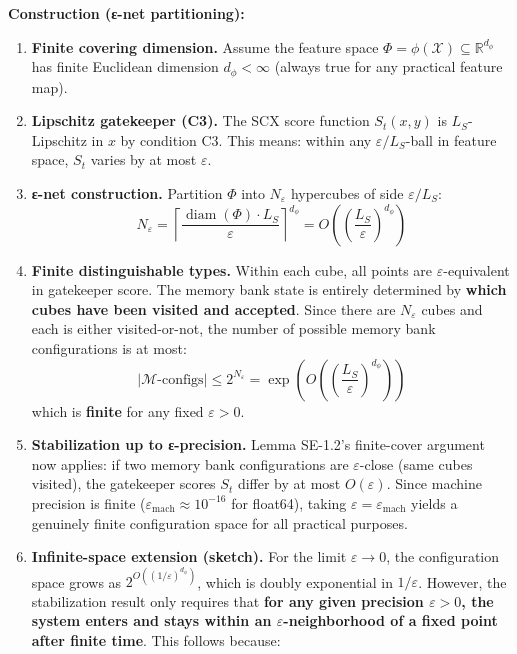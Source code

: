 \documentclass[
  12pt,
]{article}
\begin{document}
\textbf{Construction (ε-net partitioning):}

\begin{enumerate}
\def\labelenumi{\arabic{enumi}.}
\item
  \textbf{Finite covering dimension.} Assume the feature space
  \(\Phi = \phi(\mathcal{X}) \subseteq \mathbb{R}^{d_\phi}\) has finite
  Euclidean dimension \(d_\phi < \infty\) (always true for any practical
  feature map).
\item
  \textbf{Lipschitz gatekeeper (C3).} The SCX score function
  \(S_t(x, y)\) is \(L_S\)-Lipschitz in \(x\) by condition C3. This
  means: within any \(\varepsilon/L_S\)-ball in feature space, \(S_t\)
  varies by at most \(\varepsilon\).
\item
  \textbf{ε-net construction.} Partition \(\Phi\) into \(N_\varepsilon\)
  hypercubes of side \(\varepsilon/L_S\):
  \[N_\varepsilon = \left\lceil\frac{\operatorname{diam}(\Phi) \cdot L_S}{\varepsilon}\right\rceil^{d_\phi} = O\!\left(\left(\frac{L_S}{\varepsilon}\right)^{d_\phi}\right)\]
\item
  \textbf{Finite distinguishable types.} Within each cube, all points
  are \(\varepsilon\)-equivalent in gatekeeper score. The memory bank
  state is entirely determined by \textbf{which cubes have been visited
  and accepted}. Since there are \(N_\varepsilon\) cubes and each is
  either visited-or-not, the number of possible memory bank
  configurations is at most:
  \[|\mathcal{M}\text{-configs}| \leq 2^{N_\varepsilon} = \exp\!\left(O\!\left(\left(\frac{L_S}{\varepsilon}\right)^{d_\phi}\right)\right)\]
  which is \textbf{finite} for any fixed \(\varepsilon > 0\).
\item
  \textbf{Stabilization up to ε-precision.} Lemma SE-1.2's finite-cover
  argument now applies: if two memory bank configurations are
  \(\varepsilon\)-close (same cubes visited), the gatekeeper scores
  \(S_t\) differ by at most \(O(\varepsilon)\). Since machine precision
  is finite (\(\varepsilon_{\text{mach}} \approx 10^{-16}\) for
  float64), taking \(\varepsilon = \varepsilon_{\text{mach}}\) yields a
  genuinely finite configuration space for all practical purposes.
\item
  \textbf{Infinite-space extension (sketch).} For the limit
  \(\varepsilon \to 0\), the configuration space grows as
  \(2^{O((1/\varepsilon)^{d_\phi})}\), which is doubly exponential in
  \(1/\varepsilon\). However, the stabilization result only requires
  that \textbf{for any given precision \(\varepsilon > 0\), the system
  enters and stays within an \(\varepsilon\)-neighborhood of a fixed
  point after finite time}. This follows because:


\end{enumerate}
\end{document}
